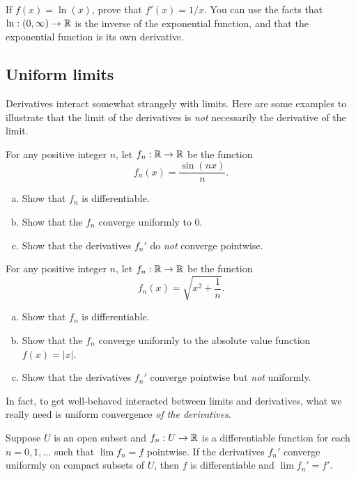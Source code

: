 \begin{exercise} \label{derivative-log-proof}
	If $f(x) = \ln(x)$, prove that $f'(x) = 1/x$. You can use the facts that $\ln : (0, \infty) \to \mathbb{R}$ is the inverse of the exponential function, and that the exponential function is its own derivative. 
\end{exercise}

\subsection{Uniform limits \starred} \label{uniform-limit}

Derivatives interact somewhat strangely with limits. Here are some examples to illustrate that the limit of the derivatives is \emph{not} necessarily the derivative of the limit.

\begin{exercise}
	For any positive integer $n$, let $f_n : \mathbb{R} \to \mathbb{R}$ be the function 
	\[ f_n(x) = \frac{\sin(nx)}{n}. \]
	\begin{enumerate}[(a)]
		\item Show that $f_n$ is differentiable. 
		\item Show that the $f_n$ converge uniformly to 0. 
		\item Show that the derivatives $f_n'$ do \emph{not} converge pointwise. 
	\end{enumerate}
\end{exercise}

\begin{exercise}
	For any positive integer $n$, let $f_n : \mathbb{R} \to \mathbb{R}$ be the function
	\[ f_n(x) = \sqrt{x^2 + \frac{1}{n}}. \]
	\begin{enumerate}[(a)]
		\item Show that $f_n$ is differentiable. 
		\item Show that the $f_n$ converge uniformly to the absolute value function $f(x) = |x|$. 
		\item Show that the derivatives $f_n'$ converge pointwise but \emph{not} uniformly. 
	\end{enumerate}
\end{exercise} 

In fact, to get well-behaved interacted between limits and derivatives, what we really need is uniform convergence \emph{of the derivatives}. 

\begin{theorem} \label{differentiation-uniform-limit}
	Suppose $U$ is an open subset and $f_n : U \to \mathbb{R}$ is a differentiable function for each $n = 0, 1, \dotsc$ such that $\lim f_n = f$ pointwise. If the derivatives $f_n'$ converge uniformly on compact subsets of $U$, then $f$ is differentiable and $\lim f_n' = f'$. 
\end{theorem}

